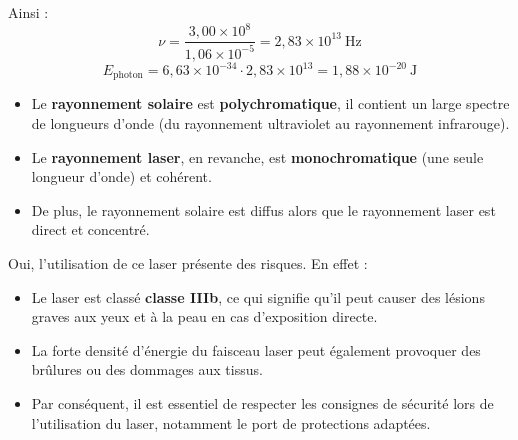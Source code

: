 \documentclass[a4paper,12pt]{article}
\begin{document}
Ainsi :
\[ \nu = \frac{3,00 \times 10^{8}}{1,06 \times 10^{-5}} = 2,83 \times 10^{13} \ \text{Hz} \]
\[ E_{\text{photon}} = 6,63 \times 10^{-34} \cdot 2,83 \times 10^{13} = 1,88 \times 10^{-20} \ \text{J} \]


\begin{itemize}[noitemsep]
    \item Le \textbf{rayonnement solaire} est \textbf{polychromatique}, il contient un large spectre de longueurs d'onde (du rayonnement ultraviolet au rayonnement infrarouge).
    \item Le \textbf{rayonnement laser}, en revanche, est \textbf{monochromatique} (une seule longueur d'onde) et cohérent.
    \item De plus, le rayonnement solaire est diffus alors que le rayonnement laser est direct et concentré.
\end{itemize}


Oui, l'utilisation de ce laser présente des risques. En effet :
\begin{itemize}[noitemsep]
    \item Le laser est classé \textbf{classe IIIb}, ce qui signifie qu'il peut causer des lésions graves aux yeux et à la peau en cas d'exposition directe.
    \item La forte densité d'énergie du faisceau laser peut également provoquer des brûlures ou des dommages aux tissus.
    \item Par conséquent, il est essentiel de respecter les consignes de sécurité lors de l'utilisation du laser, notamment le port de protections adaptées.
\end{itemize}
\end{document}

